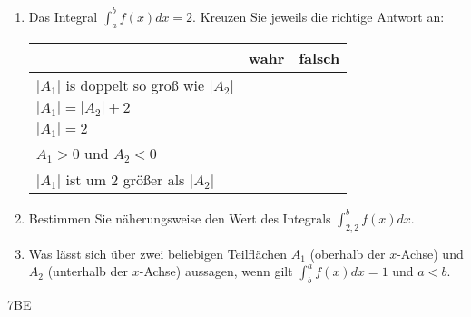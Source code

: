 \documentclass[a4paper,12pt]{article}
\begin{document}
\begin{enumerate}[label={\alph*)}]
  \item Das Integral $\int_{a}^{b}f(x)dx=2$. Kreuzen Sie jeweils die richtige Antwort an:\\
    \begin{tabular}{ p{7cm} | p{3cm} | p{3cm} | }
      \cline{2-3}
        &wahr & falsch \\
      \hline
      \multicolumn{1}{|l|}{$|A_1|$ is doppelt so groß wie $|A_2|$} &  &  \\ \hline
      \multicolumn{1}{|l|}{$|A_1|=|A_2|+2$} & &  \\ \hline
      \multicolumn{1}{|l|}{$|A_1|=2$} & &  \\ \hline
      \multicolumn{1}{|l|}{$A_1>0$ und $A_2<0$} & &  \\ \hline
      \multicolumn{1}{|l|}{$|A_1|$ ist um 2 größer als $|A_2|$} & &  \\ \hline
    \end{tabular}

  \item Bestimmen Sie näherungsweise den Wert des Integrals $\int_{2,2}^{b} f(x)dx$.
  \item Was lässt sich über zwei beliebigen Teilflächen $A_1$ (oberhalb der $x$-Achse) und $A_2$ (unterhalb der $x$-Achse) aussagen, wenn gilt $\int_{b}^{a}f(x)dx=1$ und $a<b$.
\end{enumerate}
\begin{flushright}7BE \end{flushright}


\end{document}
